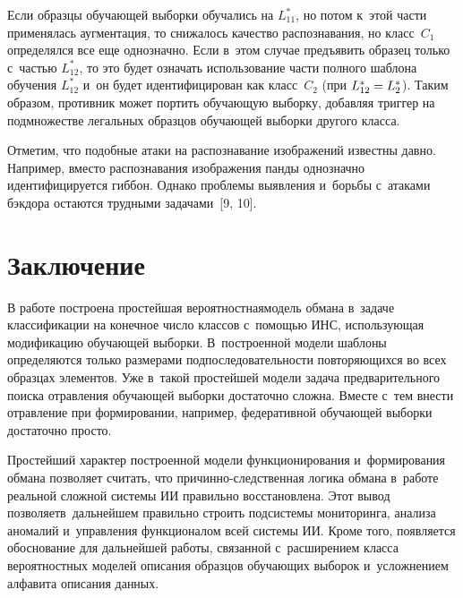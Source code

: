 \begin{multicols}{2}
  Если образцы обучающей выборки обуча\-лись на $L_{11}^*$, но потом к~этой 
части применялась аугментация, то снижалось качество распознавания, но 
класс~$C_1$ определялся все еще однозначно. Если в~этом случае предъявить 
образец только с~частью $L_{12}^*$, то это будет означать использование части 
полного шаблона обуче\-ния $L_{12}^*$ и~он будет идентифицирован как 
класс~$C_2$ (при $L_{12}^*\hm= L_2^*$). Таким образом, противник может 
портить обуча\-ющую выборку, добавляя триггер на подмножестве легальных 
образцов обуча\-ющей выборки другого класса.
  
  Отметим, что подобные атаки на распознавание изображений известны давно. 
Например, вмес\-то распознавания изображения панды однозначно 
идентифицируется гиббон. Однако проблемы выявления и~борьбы с~атаками 
бэкдора остаются трудными задачами~[9, 10].
  
  \section{Заключение}
  
  В работе построена простейшая вероятностная\linebreak модель обмана в~задаче 
классификации на конечное число классов с~по\-мощью ИНС, ис\-поль\-зу\-ющая 
модификацию обуча\-ющей выборки. В~построенной модели шаблоны 
определяются только \mbox{размерами} подпоследовательности повторяющихся во всех 
образцах элементов. Уже в~такой простейшей модели задача предварительного 
поиска отравления обуча\-ющей выборки достаточно слож\-на. Вмес\-те с~тем внес\-ти 
отравление при формировании, например, федеративной обуча\-ющей выборки 
достаточно просто.
  
  Простейший характер построенной модели функционирования и~формирования 
обмана позволяет считать, что при\-чин\-но-след\-ст\-вен\-ная логика обмана 
в~работе реальной слож\-ной сис\-те\-мы ИИ правильно восстановлена. Этот вывод 
позволяет\linebreak в~дальнейшем правильно строить под\-сис\-те\-мы мониторинга, анализа 
аномалий и~управ\-ле\-ния функционалом всей сис\-те\-мы ИИ. Кроме того, появляется 
обоснование для дальнейшей работы, \mbox{связанной} с~расширением класса 
вероятностных моделей описания образцов обуча\-ющих выборок и~услож\-не\-ни\-ем 
алфавита описания данных.
  
{\small\frenchspacing
 { %
 \begin{thebibliography}{99}
 

\end{thebibliography}}}
\end{multicols}
